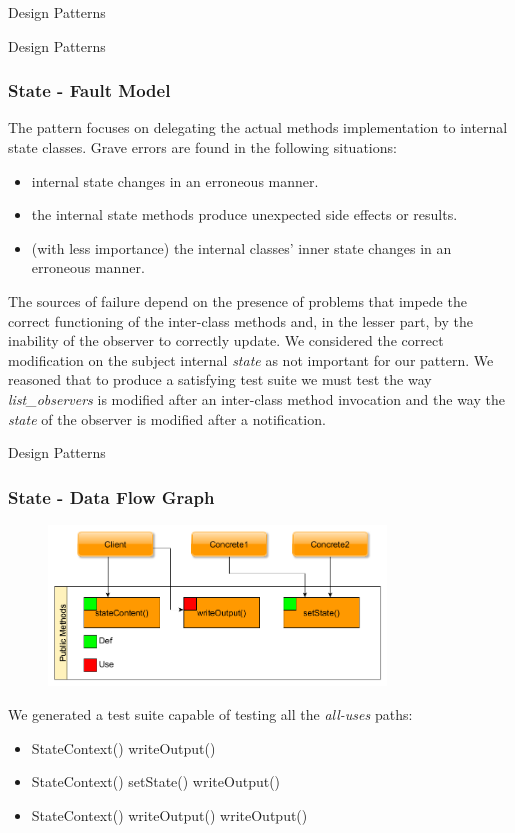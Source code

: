 \documentclass{beamer}
\begin{document}
\begin{section}{Design Patterns}
\begin{subsection}{Design Patterns}
	\begin{frame}
		\frametitle{State - Fault Model}
		The pattern focuses on delegating the actual methods implementation to internal state classes. Grave errors are found in the following situations:  
		\begin{itemize}
			\item internal state changes in an erroneous manner. 
			\item the internal state methods produce unexpected side effects or results.
			\item (with less importance) the internal classes' inner state changes in an erroneous manner.
		\end{itemize}
		\vspace{5mm}
		The sources of failure depend on the presence of problems that impede the correct functioning of the inter-class methods and, in the lesser part, by the inability of the observer to correctly update. We considered the correct modification on the subject internal \textit{state} as not important for our pattern.  We reasoned that to produce a satisfying test suite we must test the way \textit{list\_observers} is modified after an inter-class method invocation and the way the \textit{state} of the observer is modified after a notification.
		
	\end{frame}
\end{subsection}

\begin{subsection}{Design Patterns}
	\begin{frame}
		\frametitle{State - Data Flow Graph}
\begin{figure}[!h]
	\centering
	\includegraphics[width=0.8\textwidth]{./State/CallGraph.png}
	\label{Sdataflow}
\end{figure}

We generated a test suite capable of testing all the \textit{all-uses} paths:
\begin{itemize}
	\item StateContext() writeOutput() 
	\item StateContext() setState() writeOutput()
	\item StateContext() writeOutput() writeOutput()
\end{itemize}


\end{frame}
\end{subsection}
\end{section}
\end{document}
